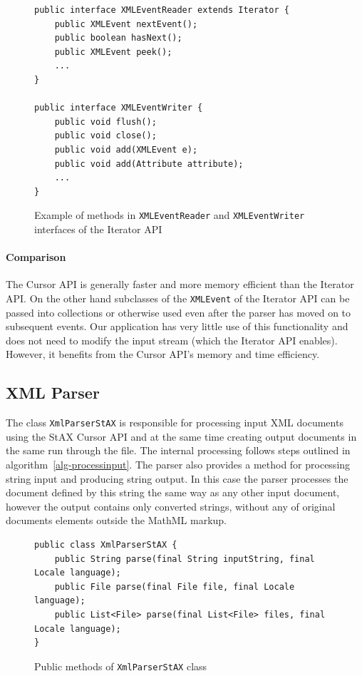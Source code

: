 \documentclass[11pt,oneside,final]{fithesis2}
\begin{document}
\begin{figure}[!ht]
\begin{lstlisting}
public interface XMLEventReader extends Iterator {
  	public XMLEvent nextEvent();
  	public boolean hasNext();
  	public XMLEvent peek();
  	...
} 

public interface XMLEventWriter {
  	public void flush();
  	public void close();
  	public void add(XMLEvent e);
  	public void add(Attribute attribute);
  	...
} 
\end{lstlisting}
\caption{Example of methods in \texttt{XMLEventReader} and \texttt{XMLEventWriter} interfaces of the Iterator API}
\label{fig:staxinterfaceapi}
\end{figure}

\paragraph*{Comparison} The Cursor API is generally faster and more memory efficient than the Iterator API. On the other hand subclasses of the \texttt{XMLEvent} of the Iterator API can be passed into collections or otherwise used even after the parser has moved on to subsequent events. Our application has very little use of this functionality and does not need to modify the input stream (which the Iterator API enables). However, it benefits from the Cursor API's memory and time efficiency.

\subsection{XML Parser}
The class \texttt{XmlParserStAX} is responsible for processing input XML documents using the StAX Cursor API and at the same time creating output documents in the same run through the file. The internal processing follows steps outlined in algorithm~\vref{alg-processinput}. The parser also provides a method for processing string input and producing string output. In this case the parser processes the document defined by this string the same way as any other input document, however the output contains only converted strings, without any of original documents elements outside the MathML markup.
\begin{figure}[!ht]
\begin{lstlisting}
public class XmlParserStAX {
	public String parse(final String inputString, final Locale language);
	public File parse(final File file, final Locale language);
	public List<File> parse(final List<File> files, final Locale language);
}
\end{lstlisting}
\caption{Public methods of \texttt{XmlParserStAX} class}
\label{fig:xmlparserstax}
\end{figure}
\end{document}

